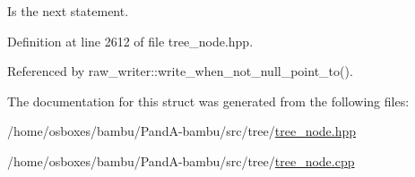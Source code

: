 Is the next statement. 



Definition at line 2612 of file tree\+\_\+node.\+hpp.



Referenced by raw\+\_\+writer\+::write\+\_\+when\+\_\+not\+\_\+null\+\_\+point\+\_\+to().



The documentation for this struct was generated from the following files\+:\begin{DoxyCompactItemize}
\item 
/home/osboxes/bambu/\+Pand\+A-\/bambu/src/tree/\hyperlink{tree__node_8hpp}{tree\+\_\+node.\+hpp}\item 
/home/osboxes/bambu/\+Pand\+A-\/bambu/src/tree/\hyperlink{tree__node_8cpp}{tree\+\_\+node.\+cpp}\end{DoxyCompactItemize}
